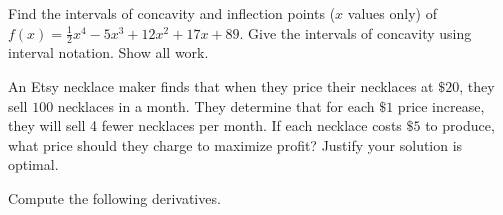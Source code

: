 \documentclass[addpoints,12pt]{exam}
\begin{document}
\begin{questions}
\newpage

\question[10] Find the intervals of concavity and inflection points ($x$ values only) of
$f(x)=\frac{1}{2}{x}^{4}-5{x}^{3}+12{x}^{2}+17x+89$. Give the intervals of concavity using
interval notation. Show all work.


\newpage




\question[12] An Etsy necklace maker finds that when they price their necklaces at $\$20 $, they
sell $100$ necklaces in a month. They determine that for each $\$1 $ price increase, they will
sell 4 fewer necklaces per month. If each necklace costs $\$5$ to produce, what price should
they charge to maximize profit? Justify your solution is optimal.

\newpage




\question



\newpage

\question Compute the following derivatives.

\begin{parts}


\end{parts}
\end{questions}
\end{document}
